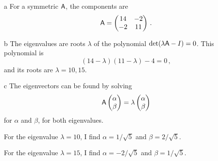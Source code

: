 \documentclass[]{homework}
\begin{document}


\begin{problem}{1}


  \begin{subproblem}{a}
    For a symmetric $\textsf A$, the components are
    \[ \textsf A = \begin{pmatrix} 14 & -2 \\ -2 & 11 \end{pmatrix}\,. \]
  \end{subproblem}
  \begin{subproblem}{b}
    The eigenvalues are roots $\lambda$ of the polynomial $\det(\lambda \textsf A - I)=0$.
    This polynomial is
    \[ (14-\lambda)(11-\lambda)-4=0\,, \]
    and its roots are $\lambda = 10, 15$.
  \end{subproblem}
  \begin{subproblem}{c}
    The eigenvectors can be found by solving
    \[ \textsf A \begin{pmatrix} \alpha \\ \beta \end{pmatrix} = \lambda \begin{pmatrix} \alpha \\ \beta \end{pmatrix} \]
    for $\alpha$ and $\beta$, for both eigenvalues.

    For the eigenvalue $\lambda = 10$, I find $\alpha = 1/\sqrt{5}$ and $\beta = 2/\sqrt{5}$.

    For the eigenvalue $\lambda = 15$, I find $\alpha = -2/\sqrt{5}$ and $\beta = 1/\sqrt{5}$.


\end{subproblem}
\end{problem}
\end{document}
